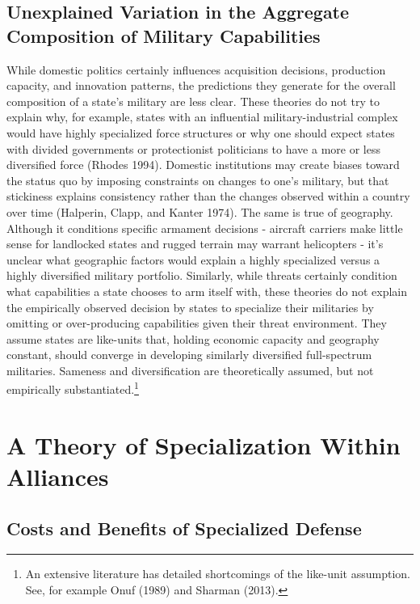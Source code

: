 \documentclass[
  12,
  letterpaper,
  DIV=11,
  numbers=noendperiod]{scrartcl}
\begin{document}
\hypertarget{unexplained-variation-in-the-aggregate-composition-of-military-capabilities}{%
\subsection{Unexplained Variation in the Aggregate Composition of
Military
Capabilities}\label{unexplained-variation-in-the-aggregate-composition-of-military-capabilities}}

While domestic politics certainly influences acquisition decisions,
production capacity, and innovation patterns, the predictions they
generate for the overall composition of a state's military are less
clear. These theories do not try to explain why, for example, states
with an influential military-industrial complex would have highly
specialized force structures or why one should expect states with
divided governments or protectionist politicians to have a more or less
diversified force (Rhodes 1994). Domestic institutions may create biases
toward the status quo by imposing constraints on changes to one's
military, but that stickiness explains consistency rather than the
changes observed within a country over time (Halperin, Clapp, and Kanter
1974). The same is true of geography. Although it conditions specific
armament decisions - aircraft carriers make little sense for landlocked
states and rugged terrain may warrant helicopters - it's unclear what
geographic factors would explain a highly specialized versus a highly
diversified military portfolio. Similarly, while threats certainly
condition what capabilities a state chooses to arm itself with, these
theories do not explain the empirically observed decision by states to
specialize their militaries by omitting or over-producing capabilities
given their threat environment. They assume states are like-units that,
holding economic capacity and geography constant, should converge in
developing similarly diversified full-spectrum militaries. Sameness and
diversification are theoretically assumed, but not empirically
substantiated.\footnote{An extensive literature has detailed
  shortcomings of the like-unit assumption. See, for example Onuf (1989)
  and Sharman (2013).}

\hypertarget{sec-theory}{%
\section{A Theory of Specialization Within Alliances}\label{sec-theory}}

\hypertarget{costs-and-benefits-of-specialized-defense}{%
\subsection{Costs and Benefits of Specialized
Defense}\label{costs-and-benefits-of-specialized-defense}}
\end{document}
